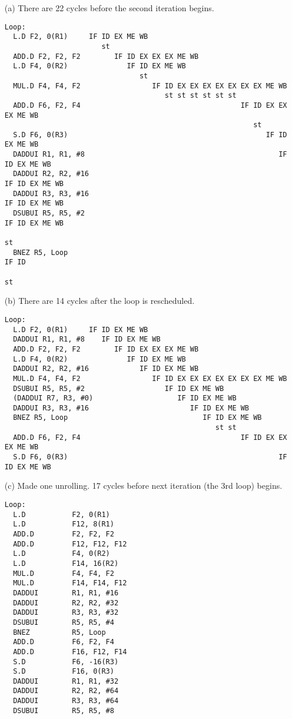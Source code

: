 \documentclass[11pt,leqno]{article}
\begin{document}
\begin{enumerate}
\item[(a)] There are 22 cycles before the second iteration begins.
{\tiny
\begin{verbatim}
Loop:
  L.D F2, 0(R1)     IF ID EX ME WB
                       st
  ADD.D F2, F2, F2        IF ID EX EX EX ME WB
  L.D F4, 0(R2)              IF ID EX ME WB
                                st
  MUL.D F4, F4, F2                 IF ID EX EX EX EX EX EX EX ME WB
                                      st st st st st st
  ADD.D F6, F2, F4                                      IF ID EX EX EX ME WB
                                                           st
  S.D F6, 0(R3)                                               IF ID EX ME WB
  DADDUI R1, R1, #8                                              IF ID EX ME WB
  DADDUI R2, R2, #16                                                IF ID EX ME WB
  DADDUI R3, R3, #16                                                   IF ID EX ME WB
  DSUBUI R5, R5, #2                                                       IF ID EX ME WB
                                                                              st
  BNEZ R5, Loop                                                                  IF ID
                                                                                    st
\end{verbatim}
}

\item[(b)] There are 14 cycles after the loop is rescheduled.
{\tiny
\begin{verbatim}
Loop:
  L.D F2, 0(R1)     IF ID EX ME WB
  DADDUI R1, R1, #8    IF ID EX ME WB
  ADD.D F2, F2, F2        IF ID EX EX EX ME WB
  L.D F4, 0(R2)              IF ID EX ME WB
  DADDUI R2, R2, #16            IF ID EX ME WB
  MUL.D F4, F4, F2                 IF ID EX EX EX EX EX EX EX ME WB
  DSUBUI R5, R5, #2                   IF ID EX ME WB
  (DADDUI R7, R3, #0)                    IF ID EX ME WB
  DADDUI R3, R3, #16                        IF ID EX ME WB
  BNEZ R5, Loop                                IF ID EX ME WB
                                                  st st
  ADD.D F6, F2, F4                                      IF ID EX EX EX ME WB
  S.D F6, 0(R3)                                                  IF ID EX ME WB
\end{verbatim}
}

\item[(c)] Made one unrolling. 17 cycles before next iteration (the 3rd loop) begins.
{\tiny
\begin{verbatim}
Loop:
  L.D           F2, 0(R1)
  L.D           F12, 8(R1)
  ADD.D         F2, F2, F2
  ADD.D         F12, F12, F12
  L.D           F4, 0(R2)
  L.D           F14, 16(R2)
  MUL.D         F4, F4, F2
  MUL.D         F14, F14, F12
  DADDUI        R1, R1, #16
  DADDUI        R2, R2, #32
  DADDUI        R3, R3, #32
  DSUBUI        R5, R5, #4
  BNEZ          R5, Loop
  ADD.D         F6, F2, F4
  ADD.D         F16, F12, F14
  S.D           F6, -16(R3)
  S.D           F16, 0(R3)
  DADDUI        R1, R1, #32  
  DADDUI        R2, R2, #64 
  DADDUI        R3, R3, #64 
  DSUBUI        R5, R5, #8 
\end{verbatim}

}
\end{enumerate}
\end{document}
